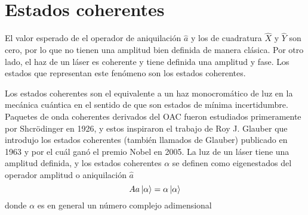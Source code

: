 
\iffalse
  donde se considera la aportación de la energía del vacío. Usando la relación de conmutación de $\hat{a}$ y $\hat{a}^{\dagger}$ sobre el estado vacío $(\hat{a}\hat{a}^{\dagger}-\hat{a}^{\dagger}\hat{a})\ket{0} = \hat{a}\hat{a}^{\dagger}\ket{0} = \ket{0}$ implica que $\hat{a}^{\dagger}\hat{a}(\hat{a}^{\dagger}\ket{0}) = \hat{a}^{\dagger}\ket{0}$, por lo que $\hat{a}^{\dagger}\ket{0}$ es un eigenestado de $\hat{a}^{\dagger}\hat{a}$ con valor propio 1, a este estado se le denomina estado de un fotón y se denota como $\ket{1} = \hat{a}^{\dagger}\ket{0}$. De forma análoga, se puede obtener el n-ésimo estado de $n$ fotones $\ket{n}$ de forma inductiva, lo que resulta en
  \begin{equation*}
    \ket{n} = \frac{\hat{a}^{\dagger\,n}}{\sqrt{n!}}\ket{0}
  \end{equation*}
\fi
\section{Estados coherentes}

El valor esperado de el operador de aniquilación $\hat{a}$ y los de cuadratura $\hat{X}$ y $\hat{Y}$ son cero, por lo que no tienen una amplitud bien definida de manera clásica. Por otro lado, el haz de un láser es coherente y tiene definida una amplitud y fase. Los estados que representan este fenómeno son los estados coherentes.

Los estados coherentes son el equivalente a un haz monocromático de luz en la mecánica cuántica en el sentido de que son estados de mínima incertidumbre.  Paquetes de onda coherentes derivados del OAC fueron estudiados primeramente por Shcrödinger en 1926, y estos inspiraron el trabajo de Roy J. Glauber \cite{Glauber} que introdujo los estados coherentes (también llamados de Glauber) publicado en 1963 y por el cuál ganó el premio Nobel en 2005. La luz de un láser tiene una amplitud definida, y los estados coherentes $\alpha$ se definen como eigenestados del operador amplitud o aniquilación $\hat{a}$ \cite{Leonhardt}
\begin{equation*}
  A{a} \ket{\alpha} = \alpha\ket{\alpha}
\end{equation*}
donde $\alpha$ es en general un número complejo adimensional

